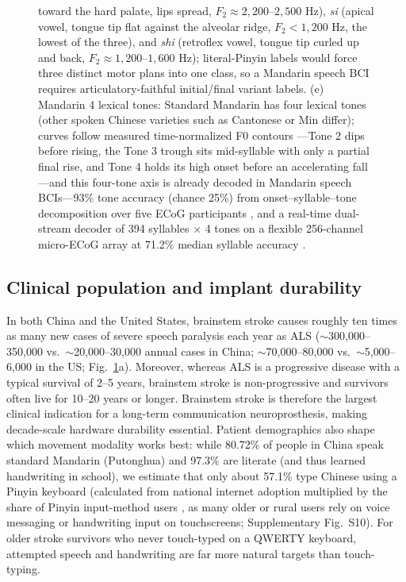 \documentclass[11pt]{article}
\begin{document}
\begin{figure}[tp]
{toward the hard palate, lips spread, $F_2 \approx 2{,}200$--$2{,}500$
Hz), \emph{si} (apical vowel, tongue tip flat against the alveolar
ridge, $F_2 < 1{,}200$ Hz, the lowest of the three), and \emph{shi}
(retroflex vowel, tongue tip curled up and back, $F_2 \approx
1{,}200$--$1{,}600$ Hz); literal-Pinyin labels would force three
distinct motor plans into one class, so a Mandarin speech BCI requires
articulatory-faithful initial/final variant labels. (e) Mandarin 4
lexical tones: Standard Mandarin has four lexical
tones (other spoken Chinese varieties such as Cantonese or Min
differ); curves follow measured time-normalized F0 contours
\cite{tupper2020, shiwang2006}---Tone 2 dips before rising, the Tone 3
trough sits mid-syllable with only a partial final rise, and Tone 4
holds its high onset before an accelerating fall---and this four-tone
axis is already decoded in Mandarin speech
BCIs---93\% tone accuracy (chance 25\%) from onset--syllable--tone
decomposition over five ECoG participants \cite{zhangd2024}, and a
real-time dual-stream decoder of 394 syllables $\times$ 4 tones on a
flexible 256-channel micro-ECoG array at 71.2\% median syllable
accuracy \cite{qian2025}.}
\label{fig:mandarin}
\end{figure}

\subsection{Clinical population and implant durability}

In both China and
the United States, brainstem stroke causes roughly ten times as many new
cases of severe speech paralysis each year as ALS ($\sim$300{,}000--350{,}000
vs.\ $\sim$20{,}000--30{,}000 annual cases in China;
$\sim$70{,}000--80{,}000 vs.\ $\sim$5{,}000--6{,}000 in the US;
Fig.~\ref{fig:mandarin}a). Moreover, whereas ALS is a progressive disease
with a typical survival of 2--5 years, brainstem stroke is
non-progressive and survivors often live for 10--20 years or longer.
Brainstem stroke is therefore the largest clinical indication for a
long-term communication neuroprosthesis, making decade-scale hardware
durability essential. Patient demographics also shape which movement
modality works best: while 80.72\% of people in China speak standard
Mandarin (Putonghua) \cite{moe2022lang} and 97.3\% are literate (and
thus learned handwriting in school), we estimate that only about 57.1\%
type Chinese using a Pinyin keyboard (calculated from national internet
adoption multiplied by the share of Pinyin input-method users
\cite{cnnic2025, iimedia2022}, as many older or rural users rely on voice
messaging or handwriting input on touchscreens; Supplementary Fig.~S10).
For older stroke survivors who never touch-typed on a QWERTY keyboard,
attempted speech and handwriting are far more natural targets than
touch-typing.
\end{document}
